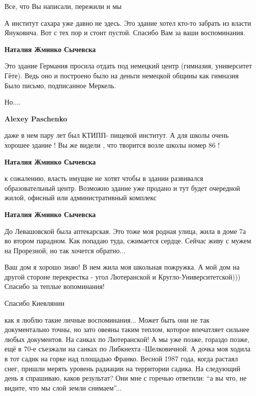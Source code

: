 \begin{itemize}
Все, что Вы написали, пережили и мы

А институт сахара уже давно не здесь. Это здание хотел кто-то забрать из власти
Януковича. Вот с тех пор и стоит пустой.  Спасибо Вам за ваши воспоминания.

\begin{itemize} %
\textbf{Наталия Жминко Сычевска} 

Это здание Германия просила отдать под немецкий центр (гимназия, университет
Гёте). Ведь оно и построено было на деньги немецкой общины как гимназия Было
письмо, подписанное Меркель.

Но....

\begin{itemize} %
\textbf{Alexey Paschenko} 

даже в нем пару лет был КТИПП- пищевой институт. А для школы очень хорошее
здание ! Вы же видели , что творится возле школы номер 86 !

\textbf{Наталия Жминко Сычевска} 

к сожалению, власть имущие не хотят чтобы в здании развивался образовательный
центр. Возможно здание уже продано и тут будет очередной жилой, офисный или
административный комплекс

\end{itemize} %

\textbf{Наталия Жминко Сычевска} 

До Левашовской была аптекарская. Это тоже моя родная улица, жила в доме 7а во
втором парадном. Как попадаю туда, сжимается сердце. Сейчас живу с мужем на
Прорезной, но так хочется обратно...

\end{itemize} %


Ваш дом я хорошо знаю! В нем жила моя школьная пожружка. А мой дом на другой
стороне перекрестка - угол Лютеранской и Кругло-Университетской))) Спасибо за
теплые вопоминания!


Спасибо Киевлянин


как я люблю такие личные воспоминания... Может быть они не так документально
точны, но зато овеяны таким теплом, которое впечатляет сильнее любых
документов. На санках по Лютеранской! А мы уже позже, гораздо позже, ещё в 70-е
съезжали на санках по Либкнехта -Шелковичной. А дочка моя ходила в тот садик на
горке над площадью Франко. Весной 1987 года, когда растаял снег, пришли мерять
уровень радиации на территории садика. На следующий день я спрашиваю, каков
результат? Они мне с горечью ответили: \enquote{а вы что, не видите, что мы
слой земли снимаем}...


\end{itemize}
